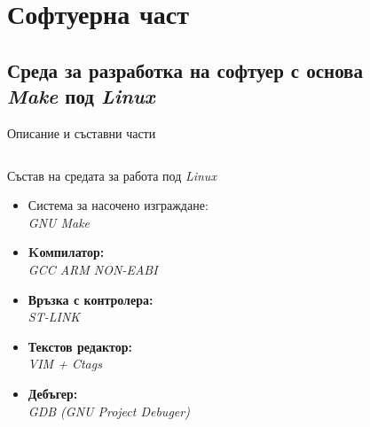 \documentclass{beamer}
\begin{document}

\section{Софтуерна част}

\subsection{Среда за разработка на софтуер с основа\\\textit{Make} под \textit{Linux}}


\begin{frame}{Описание и съставни части}
	\begin{columns}
		\begin{block}{ Състав на средата за работа под \textit{Linux}}
			\begin{itemize}
				\pause
				\item Система за насочено изграждане: \\ \textit{GNU Make}

				\pause
				\item \textbf{Kомпилатор:} \\ \textit{GCC ARM NON-EABI}

				\pause
				\item \textbf{Връзка с контролера:} \\ \textit{ST-LINK}

				\pause
				\item \textbf{Текстов редактор:} \\\textit{VIM + Ctags}

				\pause 
				\item \textbf{Дебъгер:} \\ \textit{GDB (GNU Project Debuger)} 


\end{itemize}
\end{block}
\end{columns}
\end{frame}
\end{document}
